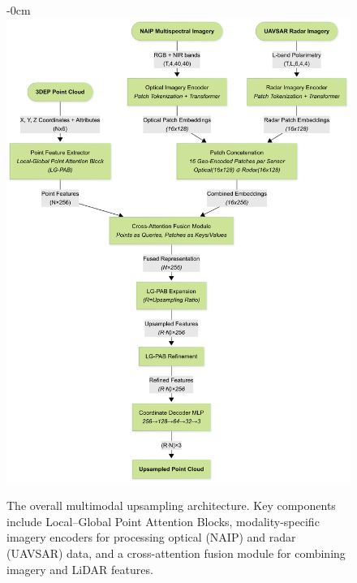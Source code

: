 \documentclass[remotesensing,article,submit,pdftex,moreauthors]{Definitions/mdpi}
\newenvironment{widefigure}[1][]{%
  \begin{figure}[#1]\begin{adjustwidth}{-\extralength}{0cm}\centering}{%
  \end{adjustwidth}\end{figure}}
\begin{document}
\begin{widefigure}
    \centering
    \includegraphics[trim=0mm 0mm 0mm 9mm, clip, width=1\linewidth]{manuscript/figures/Overall_Architecture.png}
    \caption{The overall multimodal upsampling architecture. Key components include Local–Global Point Attention Blocks, modality-specific imagery encoders for processing optical (NAIP) and radar (UAVSAR) data, and a cross-attention fusion module for combining imagery and LiDAR features.}
    \label{fig:pipeline}
\end{widefigure}
\end{document}
